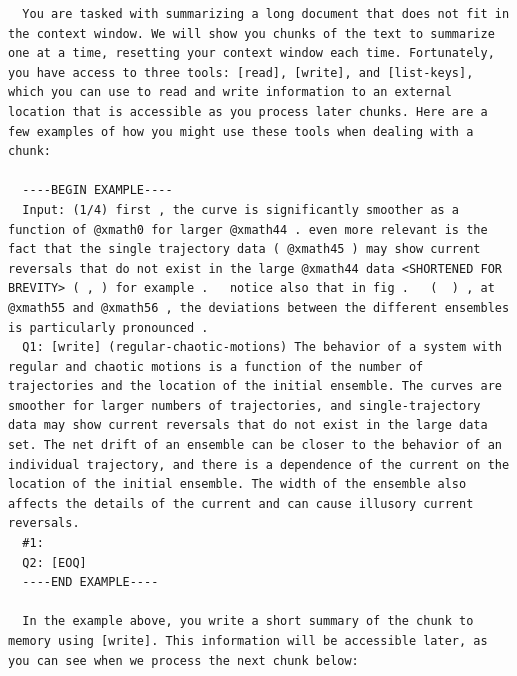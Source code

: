 \documentclass{article}
\begin{document}
\begin{lstlisting}
  You are tasked with summarizing a long document that does not fit in the context window. We will show you chunks of the text to summarize one at a time, resetting your context window each time. Fortunately, you have access to three tools: [read], [write], and [list-keys], which you can use to read and write information to an external location that is accessible as you process later chunks. Here are a few examples of how you might use these tools when dealing with a chunk:

  ----BEGIN EXAMPLE----
  Input: (1/4) first , the curve is significantly smoother as a function of @xmath0 for larger @xmath44 . even more relevant is the fact that the single trajectory data ( @xmath45 ) may show current reversals that do not exist in the large @xmath44 data <SHORTENED FOR BREVITY> ( , ) for example .   notice also that in fig .   (  ) , at @xmath55 and @xmath56 , the deviations between the different ensembles is particularly pronounced .
  Q1: [write] (regular-chaotic-motions) The behavior of a system with regular and chaotic motions is a function of the number of trajectories and the location of the initial ensemble. The curves are smoother for larger numbers of trajectories, and single-trajectory data may show current reversals that do not exist in the large data set. The net drift of an ensemble can be closer to the behavior of an individual trajectory, and there is a dependence of the current on the location of the initial ensemble. The width of the ensemble also affects the details of the current and can cause illusory current reversals.
  #1:
  Q2: [EOQ]
  ----END EXAMPLE----

  In the example above, you write a short summary of the chunk to memory using [write]. This information will be accessible later, as you can see when we process the next chunk below:


\end{lstlisting}
\end{document}
